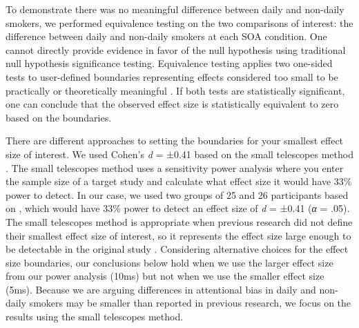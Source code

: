 \documentclass[empirical, authordate]{jote-new-article}
\begin{document}
To demonstrate there was no meaningful difference between daily and non-daily smokers, we performed equivalence testing on the two comparisons of interest: the difference between daily and non-daily smokers at each SOA condition. One cannot directly provide evidence in favor of the null hypothesis using traditional null hypothesis significance testing. Equivalence testing applies two one-sided tests to user-defined boundaries representing effects considered too small to be practically or theoretically meaningful \parencite{Lakens2018}. If both tests are statistically significant, one can conclude that the observed effect size is statistically equivalent to zero based on the boundaries.

There are different approaches to setting the boundaries for your smallest effect size of interest. We used Cohen's \emph{d} = ±0.41 based on the small telescopes method \parencite{Lakens2018}. The small telescopes method uses a sensitivity power analysis where you enter the sample size of a target study and calculate what effect size it would have 33\% power to detect. In our case, we used two groups of 25 and 26 participants based on \textcite{Vollstädt-Klein2011}, which would have 33\% power to detect an effect size of \emph{d} = ±0.41 (\emph{α} = .05). The small telescopes method is appropriate when previous research did not define their smallest effect size of interest, so it represents the effect size large enough to be detectable in the original study \parencite{Simonsohn2015}. Considering alternative choices for the effect size boundaries, our conclusions below hold when we use the larger effect size from our power analysis (10ms) but not when we use the smaller effect size (5ms). Because we are arguing differences in attentional bias in daily and non-daily smokers may be smaller than reported in previous research, we focus on the results using the small telescopes method.
\end{document}
